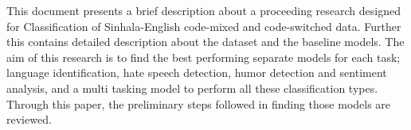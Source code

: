 This document presents a brief description about a proceeding research designed for Classification of Sinhala-English code-mixed and code-switched data. Further this contains detailed description about the dataset and the baseline models. The aim of this research is to find the best performing separate models for each task; language identification, hate speech detection, humor detection and sentiment analysis, and a multi tasking model to perform all these classification types. Through this paper, the preliminary steps followed in finding those models are reviewed.
